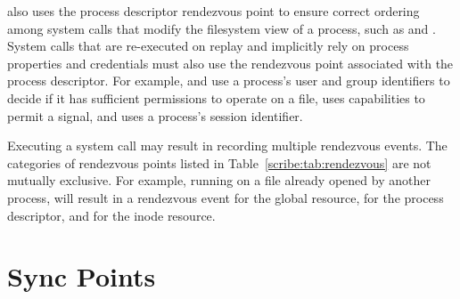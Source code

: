 \scribe{} also uses the process descriptor rendezvous point
to ensure correct ordering among system calls that modify the
filesystem view of a process, such as  and .
System calls that are re-executed on replay and
implicitly rely on process properties and credentials must also use the
rendezvous point associated with the process descriptor. For example,
 and  use a process's user and group
identifiers to decide if it has sufficient permissions to operate on a
file,  uses capabilities to permit a signal, and
 uses a process's session identifier. 

Executing a system call may result in recording multiple
rendezvous events.  The categories of rendezvous points listed in
Table~\ref{scribe:tab:rendezvous} are not mutually exclusive.  For example,
running  on a file already opened by another process, will
result in a rendezvous event for the global resource, for the process
descriptor, and for the inode resource.  

\section{Sync Points}
\label{scribe:sec:sync}

